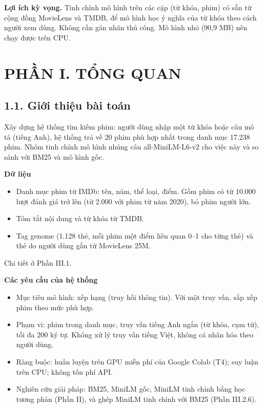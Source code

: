 \documentclass[12pt,a4paper]{article}
\providecommand{\tightlist}{\setlength{\itemsep}{0pt}\setlength{\parskip}{0pt}}
\newcommand{\lbl}[1]{\Needspace{6\baselineskip}\textbf{#1}\par\nopagebreak}
\let\oldsubsection\subsection
\renewcommand{\subsection}{\Needspace{12\baselineskip}\oldsubsection}
\newcommand{\chap}[1]{\clearpage\section{#1}}
\begin{document}
\textbf{Lợi ích kỳ vọng.} Tinh chỉnh mô hình trên các cặp (từ khóa, phim) có sẵn từ cộng đồng MovieLens và TMDB, để mô hình học ý nghĩa của từ khóa theo cách người xem dùng. Không cần gán nhãn thủ công. Mô hình nhỏ (90,9 MB) nên chạy được trên CPU.

\chap{PHẦN I. TỔNG QUAN}

\subsection{1.1. Giới thiệu bài toán}

Xây dựng hệ thống tìm kiếm phim: người dùng nhập một từ khóa hoặc câu mô tả (tiếng Anh), hệ thống trả về 20 phim phù hợp nhất trong danh mục 17.238 phim. Nhóm tinh chỉnh mô hình nhúng câu all-MiniLM-L6-v2 cho việc này và so sánh với BM25 và mô hình gốc.

\lbl{Dữ liệu}

\begin{itemize}
\tightlist
\item Danh mục phim từ IMDb: tên, năm, thể loại, điểm. Gồm phim có từ 10.000 lượt đánh giá trở lên (từ 2.000 với phim từ năm 2020), bỏ phim người lớn.
\item Tóm tắt nội dung và từ khóa từ TMDB.
\item Tag genome (1.128 thẻ, mỗi phim một điểm liên quan 0--1 cho từng thẻ) và thẻ do người dùng gắn từ MovieLens 25M.
\end{itemize}

Chi tiết ở Phần III.1.

\lbl{Các yêu cầu của hệ thống}

\begin{itemize}
\tightlist
\item Mục tiêu mô hình: xếp hạng (truy hồi thông tin). Với một truy vấn, sắp xếp phim theo mức phù hợp.
\item Phạm vi: phim trong danh mục, truy vấn tiếng Anh ngắn (từ khóa, cụm từ), tối đa 200 ký tự. Không xử lý truy vấn tiếng Việt, không cá nhân hóa theo người dùng.
\item Ràng buộc: huấn luyện trên GPU miễn phí của Google Colab (T4); suy luận trên CPU; không tốn phí API.
\item Nghiên cứu giải pháp: BM25, MiniLM gốc, MiniLM tinh chỉnh bằng học tương phản (Phần II), và ghép MiniLM tinh chỉnh với BM25 (Phần III.2.6).
\end{itemize}
\end{document}
